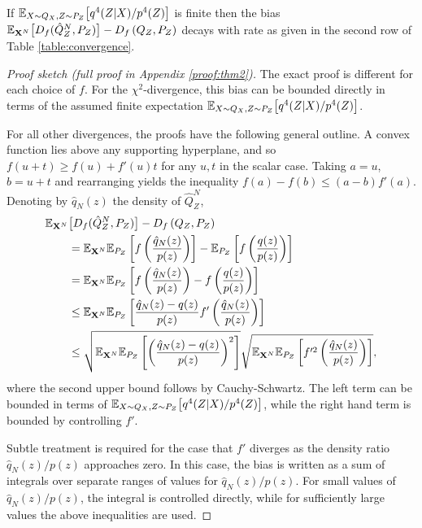 \begin{theorem}\label{thm:convergence-rate-general}
If $\mathbb{E}_{X\sim Q_X, Z\sim P_Z}\bigl[ q^4(Z|X) / p^4(Z) \bigr]$ is finite then
the bias $\mathbb{E}_{\mathbf{X}^N}\bigl[D_f( \hat{Q}_Z^N , P_Z)\bigr] - D_f\left( Q_{Z} , P_Z\right)$ decays with rate as given in the second row of Table \ref{table:convergence}.
\end{theorem}
\begin{proof}[Proof sketch (full proof in Appendix \ref{proof:thm2})]
The exact proof is different for each choice of $f$.
For the $\chi^2$-divergence, this bias can be bounded directly in terms of the assumed finite expectation $\mathbb{E}_{X\sim Q_X, Z\sim P_Z}\bigl[ q^4(Z|X) / p^4(Z) \bigr]$.

For all other divergences, the proofs have the following general outline.
A convex function lies above any supporting hyperplane, and so $f(u + t) \geq f(u) + f'(u)t$ for any $u,t$ in the scalar case.
Taking $a=u$, $b = u+t$ and rearranging yields the inequality $f(a) - f(b) \leq (a-b) f'(a)$.
Denoting by $\hat{q}_N(z)$ the density of $\hat{Q}_Z^N$,
%
\begin{align*}
\mathbb{E}_{\mathbf{X}^N} & \bigl[D_f( \hat{Q}_Z^N , P_Z)\bigr] - D_f\left( Q_{Z} , P_Z\right) \\
&= \mathbb{E}_{\mathbf{X}^N} \mathbb{E}_{P_Z} \left[ f\left( \frac{\hat{q}_N(z)}{p(z)} \right) \right] - \mathbb{E}_{P_Z} \left[ f\left( \frac{q(z)}{p(z)}\right)\right] \\
&= \mathbb{E}_{\mathbf{X}^N} \mathbb{E}_{P_Z} \left[ f\left( \frac{\hat{q}_N(z)}{p(z)} \right) - f\left( \frac{q(z)}{p(z)}\right)\right] \\
&\leq \mathbb{E}_{\mathbf{X}^N} \mathbb{E}_{P_Z} \left[ \frac{\hat{q}_N(z) - q(z)}{p(z)} f'\left(\frac{\hat{q}_N(z)}{p(z)}\right) \right] \\
&\leq \sqrt{\mathbb{E}_{\mathbf{X}^N} \mathbb{E}_{P_Z} \left[ \left( \frac{\hat{q}_N(z) - q(z)}{p(z)} \right)^2 \right]} \sqrt{\mathbb{E}_{\mathbf{X}^N} \mathbb{E}_{P_Z} \left[ f'^2\left(\frac{\hat{q}_N(z)}{p(z)}\right) \right]},
\end{align*}
%
where the second upper bound follows by Cauchy-Schwartz. 
The left term can be bounded in terms of $\mathbb{E}_{X\sim Q_X, Z\sim P_Z}\bigl[ q^4(Z|X) / p^4(Z) \bigr]$, while the right hand term is bounded by controlling $f'$.

Subtle treatment is required for the case that $f'$ diverges as the density ratio $\hat{q}_N(z)/p(z)$ approaches zero.
In this case, the bias is written as a sum of integrals over separate ranges of values for $\hat{q}_N(z)/p(z)$.
For small values of $\hat{q}_N(z)/p(z)$, the integral is controlled directly, while for sufficiently large values the above inequalities are used.
\end{proof}

